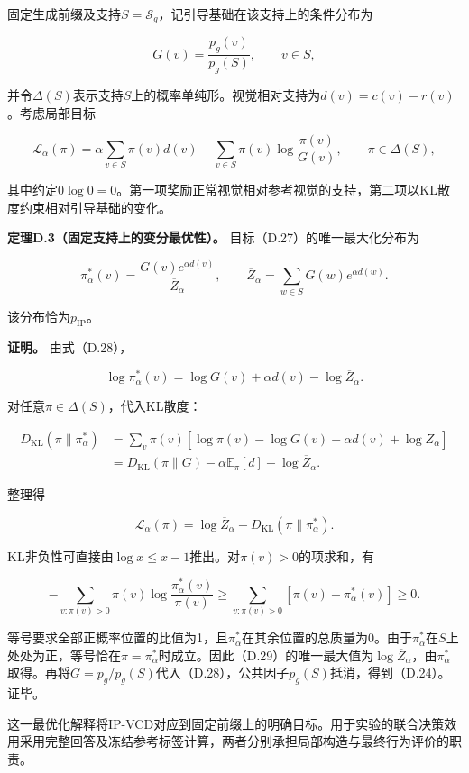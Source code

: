 固定生成前缀及支持\(S=\mathcal S_g\)，记引导基础在该支持上的条件分布为

\[
G(v)=\frac{p_g(v)}{p_g(S)},\qquad v\in S,
\tag{D.26}
\]

并令\(\Delta(S)\)表示支持\(S\)上的概率单纯形。视觉相对支持为\(d(v)=c(v)-r(v)\)。考虑局部目标

\[
\mathcal L_\alpha(\pi)
=\alpha\sum_{v\in S}\pi(v)d(v)
-\sum_{v\in S}\pi(v)\log\frac{\pi(v)}{G(v)},
\qquad\pi\in\Delta(S),
\tag{D.27}
\]

其中约定\(0\log0=0\)。第一项奖励正常视觉相对参考视觉的支持，第二项以KL散度约束相对引导基础的变化。

\textbf{定理D.3（固定支持上的变分最优性）。} 目标（D.27）的唯一最大化分布为

\[
\pi_\alpha^*(v)
=\frac{G(v)e^{\alpha d(v)}}{\overline Z_\alpha},
\qquad
\overline Z_\alpha=\sum_{w\in S}G(w)e^{\alpha d(w)}.
\tag{D.28}
\]

该分布恰为\(p_{\mathrm{IP}}\)。

\textbf{证明。} 由式（D.28），

\[
\log\pi_\alpha^*(v)=\log G(v)+\alpha d(v)-\log\overline Z_\alpha.
\]

对任意\(\pi\in\Delta(S)\)，代入KL散度：

\[
\begin{aligned}
D_{\mathrm{KL}}(\pi\|\pi_\alpha^*)
&=\sum_v\pi(v)[\log\pi(v)-\log G(v)-\alpha d(v)+\log\overline Z_\alpha]\\
&=D_{\mathrm{KL}}(\pi\|G)-\alpha\mathbb E_\pi[d]+\log\overline Z_\alpha.
\end{aligned}
\]

整理得

\[
\boxed{
\mathcal L_\alpha(\pi)
=\log\overline Z_\alpha-D_{\mathrm{KL}}(\pi\|\pi_\alpha^*).
}
\tag{D.29}
\]

KL非负性可直接由\(\log x\leq x-1\)推出。对\(\pi(v)>0\)的项求和，有

\[
-\sum_{v:\pi(v)>0}\pi(v)\log\frac{\pi_\alpha^*(v)}{\pi(v)}
\geq\sum_{v:\pi(v)>0}[\pi(v)-\pi_\alpha^*(v)]\geq0.
\]

等号要求全部正概率位置的比值为1，且\(\pi_\alpha^*\)在其余位置的总质量为0。由于\(\pi_\alpha^*\)在\(S\)上处处为正，等号恰在\(\pi=\pi_\alpha^*\)时成立。因此（D.29）的唯一最大值为\(\log\overline Z_\alpha\)，由\(\pi_\alpha^*\)取得。再将\(G=p_g/p_g(S)\)代入（D.28），公共因子\(p_g(S)\)抵消，得到（D.24）。证毕。

这一最优化解释将IP-VCD对应到固定前缀上的明确目标。用于实验的联合决策效用采用完整回答及冻结参考标签计算，两者分别承担局部构造与最终行为评价的职责。

